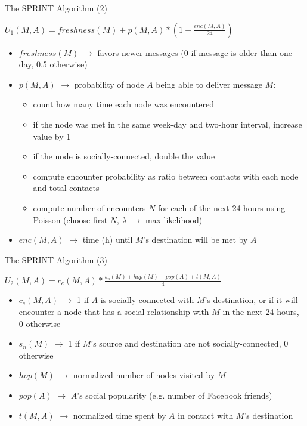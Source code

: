 \documentclass{beamer}
\begin{document}
\begin{frame}{The SPRINT Algorithm (2)}
	\hskip0.5in
	\small{
		\begin{beamerboxesrounded}[lower=block body,shadow=true,width=3.2in]{}
			\begin{center}
				\texttt{$U_1(M, A) = freshness(M) + p(M, A) * (1 - \frac{enc(M, A)}{24})$}
			\end{center}
		\end{beamerboxesrounded}
	}
	
	\begin{itemize}
		\item $freshness(M)$ $\rightarrow$ favors newer messages (0 if message is older than one day, 0.5 otherwise)
		\item $p(M,A)$ $\rightarrow$ probability of node $A$ being able to deliver message $M$:
		\begin{itemize}
			\item count how many time each node was encountered
			\item if the node was met in the same week-day and two-hour interval, increase value by 1
			\item if the node is socially-connected, double the value
			\item compute encounter probability as ratio between contacts with each node and total contacts
			\item compute number of encounters $N$ for each of the next 24 hours using Poisson (choose first $N$, $\lambda$ $\rightarrow$ max likelihood)
		\end{itemize}
		\item $enc(M,A)$ $\rightarrow$ time (h) until $M$'s destination will be met by $A$
	\end{itemize}
\end{frame}

\begin{frame}{The SPRINT Algorithm (3)}
	\hskip0.5in
	\small{
		\begin{beamerboxesrounded}[lower=block body,shadow=true,width=3.2in]{}
			\begin{center}
				\texttt{$U_2(M, A) = c_e(M, A) * \frac{s_n(M) + hop(M) + pop(A) + t(M, A)}{4}$}
			\end{center}
		\end{beamerboxesrounded}
	}
	
	\begin{itemize}
		\item $c_e(M, A)$ $\rightarrow$ 1 if $A$ is socially-connected with $M$'s destination, or if it will encounter a node that has a social relationship with $M$ in the next 24 hours, 0 otherwise
		\item $s_n(M)$ $\rightarrow$ 1 if $M$'s source and destination are not socially-connected, 0 otherwise
		\item $hop(M)$ $\rightarrow$ normalized number of nodes visited by $M$
		\item $pop(A)$ $\rightarrow$ $A$'s social popularity (e.g. number of Facebook friends)
		\item $t(M, A)$ $\rightarrow$ normalized time spent by $A$ in contact with $M$'s destination
	\end{itemize}
\end{frame}
\end{document}
